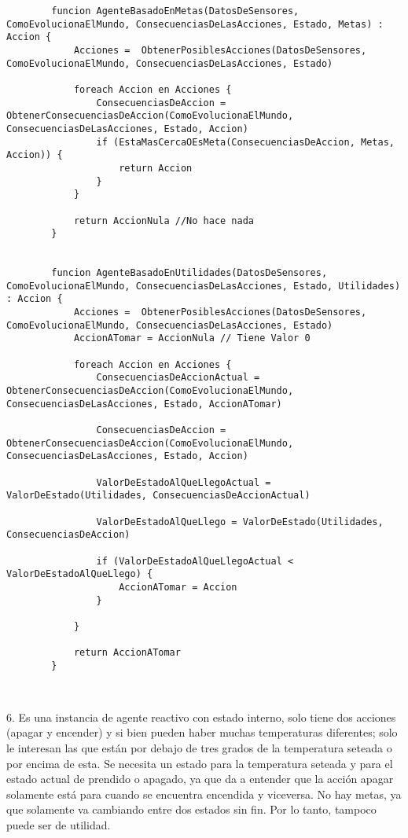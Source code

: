 \begin{center}
	\begin{lstlisting}
		funcion AgenteBasadoEnMetas(DatosDeSensores, ComoEvolucionaElMundo, ConsecuenciasDeLasAcciones, Estado, Metas) : Accion {
			Acciones =  ObtenerPosiblesAcciones(DatosDeSensores, ComoEvolucionaElMundo, ConsecuenciasDeLasAcciones, Estado)
			
			foreach Accion en Acciones {
				ConsecuenciasDeAccion = ObtenerConsecuenciasDeAccion(ComoEvolucionaElMundo, ConsecuenciasDeLasAcciones, Estado, Accion)
				if (EstaMasCercaOEsMeta(ConsecuenciasDeAccion, Metas, Accion)) {
					return Accion
				}
			}
			
			return AccionNula //No hace nada
		}
		
		
		funcion AgenteBasadoEnUtilidades(DatosDeSensores, ComoEvolucionaElMundo, ConsecuenciasDeLasAcciones, Estado, Utilidades) : Accion {
			Acciones =  ObtenerPosiblesAcciones(DatosDeSensores, ComoEvolucionaElMundo, ConsecuenciasDeLasAcciones, Estado)
			AccionATomar = AccionNula // Tiene Valor 0
			
			foreach Accion en Acciones {
				ConsecuenciasDeAccionActual = ObtenerConsecuenciasDeAccion(ComoEvolucionaElMundo, ConsecuenciasDeLasAcciones, Estado, AccionATomar)
				
				ConsecuenciasDeAccion = ObtenerConsecuenciasDeAccion(ComoEvolucionaElMundo, ConsecuenciasDeLasAcciones, Estado, Accion)
				
				ValorDeEstadoAlQueLlegoActual = ValorDeEstado(Utilidades, ConsecuenciasDeAccionActual)
				
				ValorDeEstadoAlQueLlego = ValorDeEstado(Utilidades, ConsecuenciasDeAccion)
				
				if (ValorDeEstadoAlQueLlegoActual < ValorDeEstadoAlQueLlego) {
					AccionATomar = Accion
				}
				
			}
			
			return AccionATomar
		}
		
		
	\end{lstlisting}
\end{center}



6. Es una instancia de agente reactivo con estado interno, solo tiene dos acciones (apagar y encender) y si bien pueden haber muchas temperaturas diferentes; solo le interesan las que están por debajo de tres grados de la temperatura seteada o por encima de esta. Se necesita un estado para la temperatura seteada y para el estado actual de prendido o apagado, ya que da a entender que la acción apagar solamente está para cuando se encuentra encendida y viceversa. No hay metas, ya que solamente va cambiando entre dos estados sin fin. Por lo tanto, tampoco puede ser de utilidad.

\bigskip